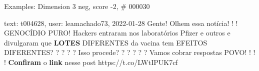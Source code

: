 \begin{frame}{Examples: Dimension 3 neg, score -2, \# 000030}
\footnotesize
\begin{alertblock}{text: t004628, user: leamachado73, 2022-01-28}
Gente! Olhem essa notícia! ! ! GENOCÍDIO PURO! Hackers entraram nos 
laboratórios Pfizer e outros e divulgaram que \textbf{LOTES} DIFERENTES da 
vacina tem EFEITOS DIFERENTES? ? ? ? ? Isso procede? ? ? ? ? ? Vamos cobrar 
respostas POVO! ! ! ! \textbf{Confiram} o \textbf{link} nesse post 
  
  
  
 https://t.co/LWtIPUK7cf 
\end{alertblock}
\end{frame}

